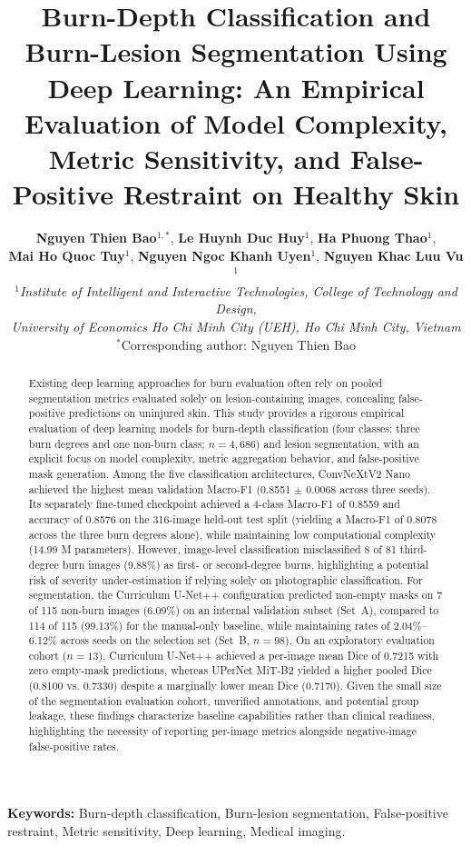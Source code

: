 \documentclass[11pt,a4paper]{article}
\title{
  \textbf{\Large
  Burn-Depth Classification and Burn-Lesion Segmentation Using Deep Learning:
  An Empirical Evaluation of Model Complexity, Metric Sensitivity,
  and False-Positive Restraint on Healthy Skin}
}
\author{
  \textbf{Nguyen Thien Bao$^{1,*}$},
  \textbf{Le Huynh Duc Huy$^{1}$},
  \textbf{Ha Phuong Thao$^{1}$}, \\
  \textbf{Mai Ho Quoc Tuy$^{1}$},
  \textbf{Nguyen Ngoc Khanh Uyen$^{1}$},
  \textbf{Nguyen Khac Luu Vu$^{1}$}
  \\[1.5ex]
  \small $^{1}$\textit{Institute of Intelligent and Interactive Technologies, College of Technology and Design,} \\
  \small \textit{University of Economics Ho Chi Minh City (UEH), Ho Chi Minh City, Vietnam}
  \\[1ex]
  \small $^{*}$Corresponding author: Nguyen Thien Bao
}
\date{}
\begin{document}
\maketitle
\begin{abstract}
\noindent Existing deep learning approaches for burn evaluation often rely on pooled segmentation metrics evaluated solely on lesion-containing images, concealing false-positive predictions on uninjured skin. This study provides a rigorous empirical evaluation of deep learning models for burn-depth classification (four classes: three burn degrees and one non-burn class; $n = 4{,}686$) and lesion segmentation, with an explicit focus on model complexity, metric aggregation behavior, and false-positive mask generation. Among the five classification architectures, ConvNeXtV2 Nano achieved the highest mean validation Macro-F1 (0.8551 $\pm$ 0.0068 across three seeds). Its separately fine-tuned checkpoint achieved a 4-class Macro-F1 of 0.8559 and accuracy of 0.8576 on the 316-image held-out test split (yielding a Macro-F1 of 0.8078 across the three burn degrees alone), while maintaining low computational complexity (14.99 M parameters). However, image-level classification misclassified 8 of 81 third-degree burn images (9.88\%) as first- or second-degree burns, highlighting a potential risk of severity under-estimation if relying solely on photographic classification. For segmentation, the Curriculum U-Net++ configuration predicted non-empty masks on 7 of 115 non-burn images (6.09\%) on an internal validation subset (Set~A), compared to 114 of 115 (99.13\%) for the manual-only baseline, while maintaining rates of 2.04\%--6.12\% across seeds on the selection set (Set~B, $n = 98$). On an exploratory evaluation cohort ($n = 13$), Curriculum U-Net++ achieved a per-image mean Dice of 0.7215 with zero empty-mask predictions, whereas UPerNet MiT-B2 yielded a higher pooled Dice (0.8100 vs. 0.7330) despite a marginally lower mean Dice (0.7170). Given the small size of the segmentation evaluation cohort, unverified annotations, and potential group leakage, these findings characterize baseline capabilities rather than clinical readiness, highlighting the necessity of reporting per-image metrics alongside negative-image false-positive rates.
\end{abstract}

\vspace{1ex}
\noindent\textbf{Keywords:} Burn-depth classification, Burn-lesion segmentation, False-positive restraint, Metric sensitivity, Deep learning, Medical imaging.
\end{document}
